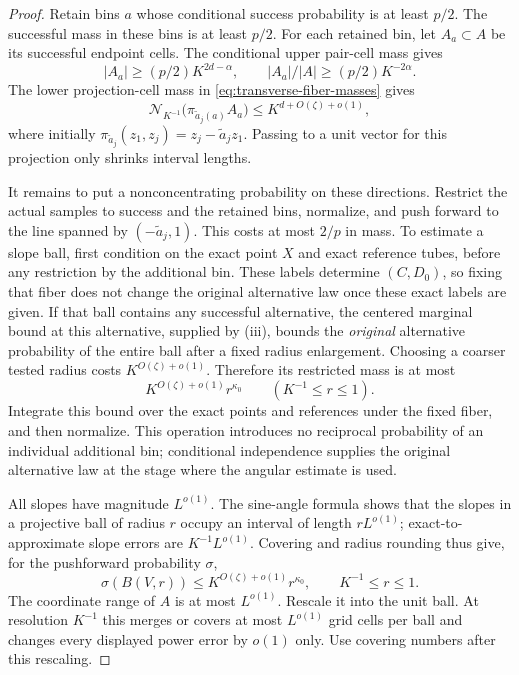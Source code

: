 \begin{proof}
Retain bins $a$ whose conditional success probability is at least
$p/2$.  The successful mass in these bins is at least $p/2$.
For each retained bin, let $A_a\subset A$ be its successful endpoint
cells.  The conditional upper pair-cell mass gives
\[
 |A_a|\ge(p/2)K^{2d-\alpha},\qquad
 |A_a|/|A|\ge(p/2)K^{-2\alpha}.
\]
The lower projection-cell mass in
\eqref{eq:transverse-fiber-masses} gives
\begin{equation}\label{eq:transverse-small-projections}
 \mathcal N_{K^{-1}}\bigl(\pi_{\widetilde a_j(a)}A_a\bigr)
          \le K^{d+O(\zeta)+o(1)},
\end{equation}
where initially $\pi_{\widetilde a_j}(z_1,z_j)
=z_j-\widetilde a_jz_1$.  Passing to a unit vector for this
projection only shrinks interval lengths.

It remains to put a nonconcentrating probability on these directions.
Restrict the actual samples to success and the retained bins, normalize,
and push forward to the line spanned by $(-\widetilde a_j,1)$.
This costs at most $2/p$ in mass.  To estimate a slope ball, first
condition on the exact point $X$ and exact reference tubes, before
any restriction by the additional bin.  These labels determine
$(C,D_0)$, so fixing that fiber does not change the original
alternative law once these exact labels are given.  If that ball contains any
successful alternative, the centered marginal bound at this
alternative, supplied by (iii), bounds the \emph{original}
alternative probability of the entire ball after a fixed radius
enlargement.  Choosing a coarser tested radius costs
$K^{O(\zeta)+o(1)}$.  Therefore its restricted mass is at most
\[
 K^{O(\zeta)+o(1)}r^{\kappa_0}\qquad(K^{-1}\le r\le1).
\]
Integrate this bound over the exact points and references under the
fixed fiber, and then normalize.  This operation introduces no
reciprocal probability of an individual additional bin; conditional
independence supplies the original alternative law at the stage
where the angular estimate is used.

All slopes have magnitude $L^{o(1)}$.  The sine-angle formula shows
that the slopes in a projective ball of radius $r$ occupy an interval
of length $rL^{o(1)}$; exact-to-approximate slope errors are
$K^{-1}L^{o(1)}$.  Covering and radius rounding thus give, for the
pushforward probability $\sigma$,
\begin{equation}\label{eq:transverse-direction-measure}
 \sigma(B(V,r))\le K^{O(\zeta)+o(1)}r^{\kappa_0},
                   \qquad K^{-1}\le r\le1.
\end{equation}
The coordinate range of $A$ is at most $L^{o(1)}$.  Rescale it into
the unit ball.  At resolution $K^{-1}$ this merges or covers at most
$L^{o(1)}$ grid cells per ball and changes every displayed power
error by $o(1)$ only.  Use covering numbers after this rescaling.


\end{proof}
